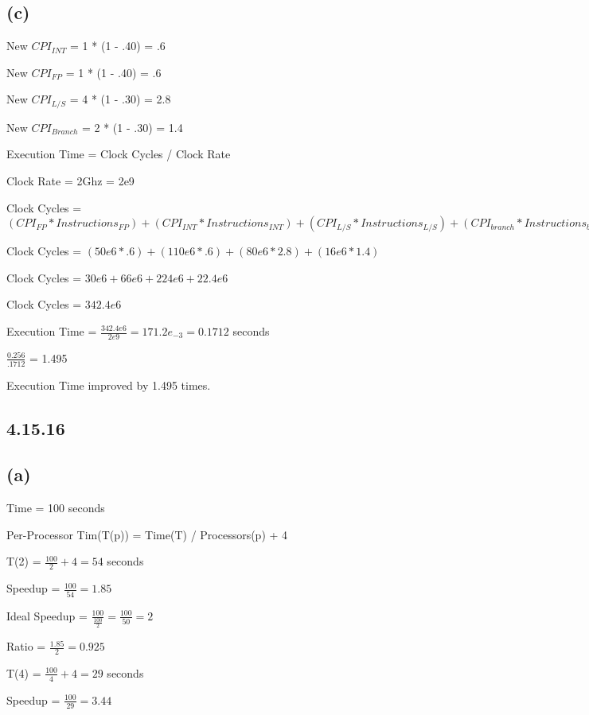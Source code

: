 \documentclass{article}
\begin{document}
    \subsection*{(c)}

    New $CPI_{INT}$ = 1 * (1 - .40) = .6

    New $CPI_{FP}$ = 1 * (1 - .40) = .6

    New $CPI_{L/S}$ = 4 * (1 - .30) = 2.8

    New $CPI_{Branch}$ = 2 * (1 - .30) = 1.4

    Execution Time = Clock Cycles / Clock Rate

    Clock Rate = 2Ghz = 2e9

    Clock Cycles = $(CPI_{FP} * Instructions_{FP}) + (CPI_{INT} * Instructions_{INT}) + (CPI_{L/S} * Instructions_{L/S}) + (CPI_{branch}* Instructions_{branch})$

    Clock Cycles = $(50e6 * .6) + (110e6 * .6) + (80e6 * 2.8) + (16e6 * 1.4)$

    Clock Cycles = $30e6 + 66e6 + 224e6 + 22.4e6$

    Clock Cycles = $342.4e6$

    Execution Time = $\frac{342.4e6}{2e9} = 171.2e_{-3} = 0.1712$ seconds

    $\frac{0.256}{.1712}$ = 1.495

    Execution Time improved by 1.495 times.

    \subsection*{4.15.16}
    
    \subsection*{(a)}

    Time = 100 seconds

    Per-Processor Tim(T(p)) = Time(T) / Processors(p) + 4

    T(2) = $\frac{100}{2} + 4 = 54$ seconds

    Speedup = $\frac{100}{54} = 1.85$ 

    Ideal Speedup = $\frac{100}{\frac{100}{2}} = \frac{100}{50} = 2$

    Ratio = $\frac{1.85}{2} = 0.925$
    \vspace*{6pt}

    T(4) = $\frac{100}{4} + 4 = 29$ seconds

    Speedup = $\frac{100}{29} = 3.44$ 
\end{document}
